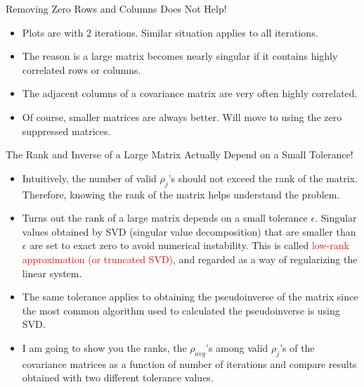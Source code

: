 \documentclass[aspectratio=169]{beamer}
\begin{document}
\begin{frame}{Removing Zero Rows and Columns Does Not Help!}
  \begin{itemize}
    \scriptsize
    \item Plots are with 2 iterations. Similar situation applies to all iterations.
    \item The reason is a large matrix becomes nearly singular if it contains highly correlated rows or columns. 
    \item The adjacent columns of a covariance matrix are very often highly correlated.
    \item Of course, smaller matrices are always better. Will move to using the zero suppressed matrices.
  \end{itemize}
\end{frame}

\begin{frame}{The Rank and Inverse of a Large Matrix Actually Depend on a Small Tolerance!}
  \begin{itemize}
    \item Intuitively, the number of valid $\rho_j$'s should not exceed the rank of the matrix. Therefore, knowing the rank of the matrix helps understand the problem.
    \item Turns out the rank of a large matrix depends on a small tolerance $\epsilon$. Singular values obtained by SVD (singular value decomposition) that are smaller than $\epsilon$ are set to exact zero to avoid numerical instability. This is called \textcolor{red}{low-rank approximation (or truncated SVD)}, and regarded as a way of regularizing the linear system.
    \item The same tolerance applies to obtaining the pseudoinverse of the matrix since the most common algorithm used to calculated the pseudoinverse is using SVD.
    \item I am going to show you the ranks, the $\rho_{avg}$'s among valid $\rho_j$'s of the covariance matrices as a function of number of iterations and compare results obtained with two different tolerance values.
  \end{itemize}
\end{frame}
\end{document}
